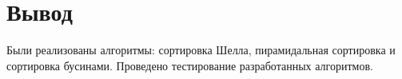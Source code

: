\section*{Вывод}

Были реализованы алгоритмы: сортировка Шелла, пирамидальная сортировка и сортировка бусинами. Проведено тестирование разработанных алгоритмов.
